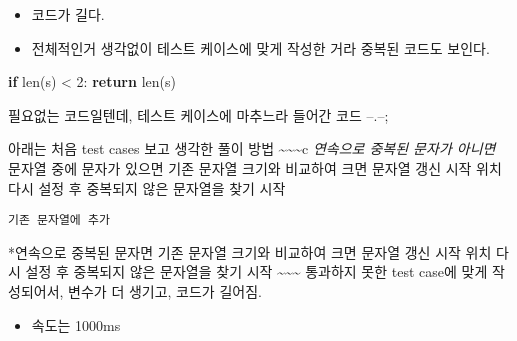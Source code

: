 \documentclass[11pt]{article}
\providecommand{\tightlist}{%
      \setlength{\itemsep}{0pt}\setlength{\parskip}{0pt}}
\newenvironment{Shaded}{}{}
\newcommand{\DecValTok}[1]{\textcolor[rgb]{0.25,0.63,0.44}{{#1}}}
\newcommand{\NormalTok}[1]{{#1}}
\newcommand{\ControlFlowTok}[1]{\textcolor[rgb]{0.00,0.44,0.13}{\textbf{{#1}}}}
\begin{document}
\begin{itemize}
\tightlist
\item
  코드가 길다.
\item
  전체적인거 생각없이 테스트 케이스에 맞게 작성한 거라 중복된 코드도
  보인다.
\end{itemize}

\begin{Shaded}
\begin{Highlighting}[]
\ControlFlowTok{if}\NormalTok{ len(s) < }\DecValTok{2}\NormalTok{:}
            \ControlFlowTok{return}\NormalTok{ len(s)}
\end{Highlighting}
\end{Shaded}

필요없는 코드일텐데, 테스트 케이스에 마추느라 들어간 코드 --.--;

아래는 처음 test cases 보고 생각한 풀이 방법
\textasciitilde{}\textasciitilde{}\textasciitilde{}c \emph{연속으로
중복된 문자가 아니면 }문자열 중에 문자가 있으면 기존 문자열 크기와
비교하여 크면 문자열 갱신 시작 위치 다시 설정 후 중복되지 않은 문자열을
찾기 시작

\begin{verbatim}
기존 문자열에 추가   
\end{verbatim}

*연속으로 중복된 문자면 기존 문자열 크기와 비교하여 크면 문자열 갱신
시작 위치 다시 설정 후 중복되지 않은 문자열을 찾기 시작
\textasciitilde{}\textasciitilde{}\textasciitilde{} 통과하지 못한 test
case에 맞게 작성되어서, 변수가 더 생기고, 코드가 길어짐.

\begin{itemize}
\tightlist
\item
  속도는 1000ms
\end{itemize}
\end{document}
